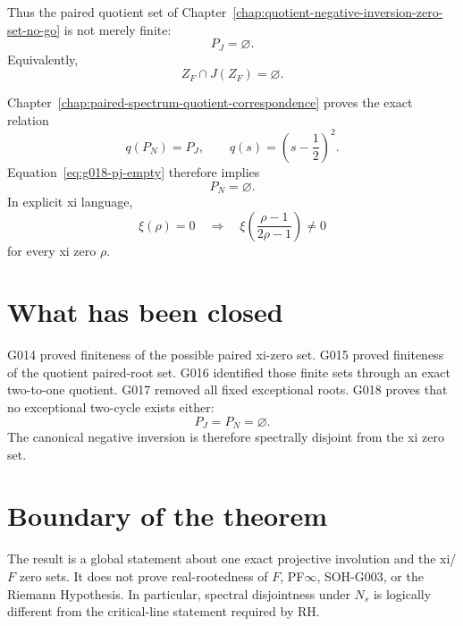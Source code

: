 Thus the paired quotient set of Chapter~\ref{chap:quotient-negative-inversion-zero-set-no-go} is not merely finite:
\begin{equation}
 \boxed{P_J=\varnothing}.
 \label{eq:g018-pj-empty}
\end{equation}
Equivalently,
\[
 \boxed{Z_F\cap J(Z_F)=\varnothing}.
\]

Chapter~\ref{chap:paired-spectrum-quotient-correspondence} proves the exact relation
\[
 q(P_N)=P_J,
 \qquad
 q(s)=\left(s-\frac12\right)^2.
\]
Equation~\eqref{eq:g018-pj-empty} therefore implies
\begin{equation}
 \boxed{P_N=\varnothing}.
 \label{eq:g018-pn-empty}
\end{equation}
In explicit xi language,
\[
 \boxed{
 \xi(\rho)=0
 \quad\Longrightarrow\quad
 \xi\!\left(\frac{\rho-1}{2\rho-1}\right)\ne0
 }
\]
for every xi zero $\rho$.

\section{What has been closed}

G014 proved finiteness of the possible paired xi-zero set.  G015 proved finiteness of the quotient paired-root set.  G016 identified those finite sets through an exact two-to-one quotient.  G017 removed all fixed exceptional roots.  G018 proves that no exceptional two-cycle exists either:
\[
 \boxed{P_J=P_N=\varnothing}.
\]
The canonical negative inversion is therefore spectrally disjoint from the xi zero set.

\section{Boundary of the theorem}

The result is a global statement about one exact projective involution and the xi/$F$ zero sets.  It does not prove real-rootedness of $F$, PF$\infty$, SOH-G003, or the Riemann Hypothesis.  In particular, spectral disjointness under $N_s$ is logically different from the critical-line statement required by RH.
